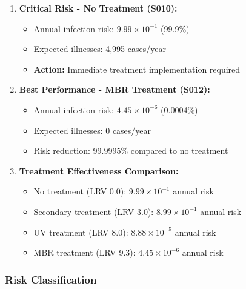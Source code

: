 \documentclass[11pt,a4paper]{article}
\begin{document}
\begin{enumerate}[leftmargin=*]
    \item \textbf{Critical Risk - No Treatment (S010):}
    \begin{itemize}
        \item Annual infection risk: $9.99 \times 10^{-1}$ (99.9\%)
        \item Expected illnesses: 4,995 cases/year
        \item \textcolor{riskred}{\textbf{Action:}} Immediate treatment implementation required
    \end{itemize}

    \item \textbf{Best Performance - MBR Treatment (S012):}
    \begin{itemize}
        \item Annual infection risk: $4.45 \times 10^{-6}$ (0.0004\%)
        \item Expected illnesses: 0 cases/year
        \item Risk reduction: 99.9995\% compared to no treatment
    \end{itemize}

    \item \textbf{Treatment Effectiveness Comparison:}
    \begin{itemize}
        \item No treatment (LRV 0.0): $9.99 \times 10^{-1}$ annual risk
        \item Secondary treatment (LRV 3.0): $8.99 \times 10^{-1}$ annual risk
        \item UV treatment (LRV 8.0): $8.88 \times 10^{-5}$ annual risk
        \item MBR treatment (LRV 9.3): $4.45 \times 10^{-6}$ annual risk
    \end{itemize}
\end{enumerate}

\subsubsection{Risk Classification}
\end{document}
